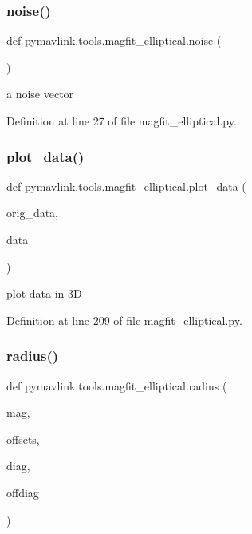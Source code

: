 \subsubsection{\texorpdfstring{noise()}{noise()}}
{\footnotesize\ttfamily def pymavlink.\+tools.\+magfit\+\_\+elliptical.\+noise (\begin{DoxyParamCaption}{ }\end{DoxyParamCaption})}

\begin{DoxyVerb}a noise vector\end{DoxyVerb}
 

Definition at line 27 of file magfit\+\_\+elliptical.\+py.

\mbox{\label{namespacepymavlink_1_1tools_1_1magfit__elliptical_a2a617907e38315cd4da32635d1a9805b}} 
\subsubsection{\texorpdfstring{plot\_data()}{plot\_data()}}
{\footnotesize\ttfamily def pymavlink.\+tools.\+magfit\+\_\+elliptical.\+plot\+\_\+data (\begin{DoxyParamCaption}\item[{}]{orig\+\_\+data,  }\item[{}]{data }\end{DoxyParamCaption})}

\begin{DoxyVerb}plot data in 3D\end{DoxyVerb}
 

Definition at line 209 of file magfit\+\_\+elliptical.\+py.

\mbox{\label{namespacepymavlink_1_1tools_1_1magfit__elliptical_ad64337f0e7fad08ebdde9d99930c0c4b}} 
\subsubsection{\texorpdfstring{radius()}{radius()}}
{\footnotesize\ttfamily def pymavlink.\+tools.\+magfit\+\_\+elliptical.\+radius (\begin{DoxyParamCaption}\item[{}]{mag,  }\item[{}]{offsets,  }\item[{}]{diag,  }\item[{}]{offdiag }\end{DoxyParamCaption})}

